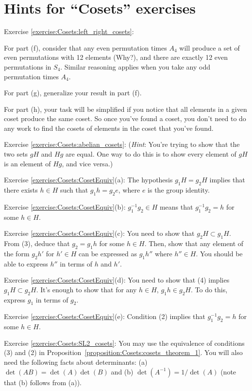 \section{Hints for ``Cosets'' exercises}
\label{sec:Cosets:Hints} 

\noindent Exercise \ref{exercise:Cosets:left_right_cosets}: 

For part (f), consider that any even permutation times $A_4$ will produce a set of even permutations with 12 elements (Why?), and there are exactly 12 even permutations in $S_4$.  Similar reasoning applies when you take any odd permutation times $A_4$.

For part (g), generalize your result in part (f).

For part (h), your task will be simplified if you notice that all elements in a given coset produce the same coset. So once you've found a coset, you don't need to do any work to find the cosets of elements in the coset that you've found.


\noindent Exercise \ref{exercise:Cosets:abelian_cosets}:  (\emph{Hint}: You're trying to show that the two sets $gH$ and $Hg$ are equal. One way to do this is to show every element of $gH$ is an element of $Hg$, and vice versa.)


\noindent Exercise \ref{exercise:Cosets:CosetEquiv}(a): The hypothesis $g_1 H = g_2 H$ implies that there exists $h \in H$ such that $g_1 h  = g_2 e$, where $e$ is the group identity. 

\noindent Exercise \ref{exercise:Cosets:CosetEquiv}(b):   $g_1^{-1} g_2 \in H$ means that $g_1^{-1} g_2 = h$ for some $h \in H$. 

\noindent Exercise \ref{exercise:Cosets:CosetEquiv}(c):   You need to show that $g_2 H \subset g_1 H$. From (3), deduce that $g_2 = g_1 h$ for some $h \in H$. Then, show that any element of the form $g_2 h'$ for $h' \in H$ can be expressed as $g_1 h''$ where $h'' \in H$. You should be able to express $h''$ in terms of $h$ and $h'$.

\noindent Exercise \ref{exercise:Cosets:CosetEquiv}(d):   You need to show that (4) implies $g_1H \subset g_2H$. It's enough to show that for any $h \in H$,  $g_1 h \in g_2 H$. To do this, express $g_1$ in terms of $g_2$. 

\noindent Exercise \ref{exercise:Cosets:CosetEquiv}(e):    Condition (2) implies that $g_1^{-1} g_2 = h$ for some $h \in H$.

\noindent Exercise \ref{exercise:Cosets:SL2_cosets}:  You may use the equivalence of conditions (3) and (2) in Proposition~\ref{proposition:Cosets:cosets_theorem_1}.  You will also need the following facts about determinants:  (a) $\det(AB) = \det(A)\det(B)$ and (b) $\det(A^{-1}) = 1/\det(A)$  (note that (b) follows from (a)).

